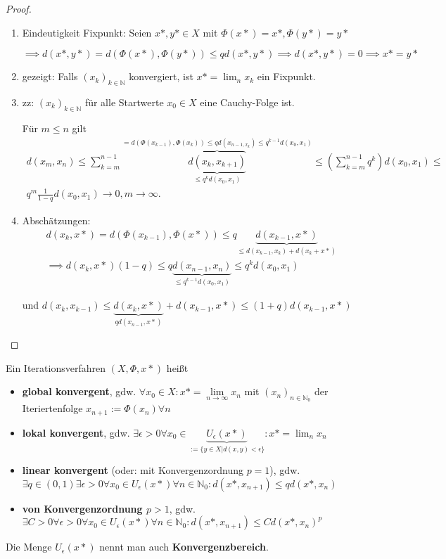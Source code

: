 \begin{proof}
	\begin{enumerate}
		\item Eindeutigkeit Fixpunkt: Seien $x*, y* \in X$ mit $\Phi(x*) = x*, \Phi(y*) = y*$
		
		$\implies d(x*, y*) = d(\Phi(x*), \Phi(y*)) \leq q d(x*, y*) \implies d(x*, y*) = 0 \implies x* = y*$
		
		\item gezeigt: Falls $(x_k)_{k \in \mathbb{N}}$ konvergiert, ist $x* = \lim_n x_k$ ein Fixpunkt.
		
		\item zz: $(x_k)_{k \in \mathbb{N}}$ für alle Startwerte $x_0 \in X$ eine Cauchy-Folge ist.
		
		Für $m \leq n$ gilt
		\begin{align*}
			d(x_m, x_n) \leq \sum_{k=m}^{n-1} \overbrace{\underbrace{d(x_k, x_{k+1})}_{\leq q^k d(x_0, x_1)}}^{= d(\Phi(x_{k-1}), \Phi(x_k)) \leq q d(x_{n-1, x_k}) \leq q^{k-1} d(x_0, x_1)} \leq \left(\sum_{k=m}^{n-1} q^k\right) d(x_0, x_1) \leq\\
			q^m \frac{1}{1-q} d(x_0, x_1) \rightarrow 0, m \rightarrow \infty.
		\end{align*}
		
		\item Abschätzungen:
		\begin{align*}
			d(x_k, x*) = d(\Phi(x_{k-1}), \Phi(x*)) \leq q \underbrace{d(x_{k-1}, x*)}_{\leq d(x_{k-1}, x_k) + d(x_k + x*)}\\
			\implies d(x_k, x*) (1-q) \leq q \underbrace{d(x_{n-1}, x_n)}_{\leq q^{k-1} d(x_0, x_1)} \leq q^k d(x_0, x_1)
		\end{align*}
		
		und $d(x_k, x_{k-1}) \leq \underbrace{d(x_k, x*)}_{q d(x_{n-1}, x*)} + d(x_{k-1}, x*) \leq (1+q) d(x_{k-1}, x*)$
	\end{enumerate}
\end{proof}

\begin{definition}
	Ein Iterationsverfahren $(X, \Phi, x*)$ heißt
	\begin{itemize}
		\item \textbf{global konvergent}, gdw. $\forall x_0 \in X: x* = \lim\limits_{n\rightarrow\infty} x_n$ mit $(x_n)_{n\in\mathbb{N}_0}$ der Iteriertenfolge $x_{n+1} := \Phi(x_n) \forall n$
		\item \textbf{lokal konvergent}, gdw. $\exists \epsilon > 0 \forall x_0 \in \underbrace{U_\epsilon(x*)}_{:=\{y \in X| d(x,y) < \epsilon\}}: x* = \lim_n x_n$
		\item \textbf{linear konvergent} (oder: mit Konvergenzordnung $p=1$), gdw. $\exists q \in (0,1) \exists \epsilon > 0 \forall x_0 \in U_\epsilon(x*) \forall n \in \mathbb{N}_0: d(x*, x_{n+1}) \leq q d(x*, x_n)$
		\item \textbf{von Konvergenzordnung $p > 1$}, gdw. $\exists C>0 \forall \epsilon>0 \forall x_0 \in U_\epsilon(x*) \forall n \in \mathbb{N}_0: d(x*, x_{n+1}) \leq C d(x*, x_n)^p$
	\end{itemize}
	
	Die Menge $U_\epsilon(x*)$ nennt man auch \textbf{Konvergenzbereich}.
\end{definition}

